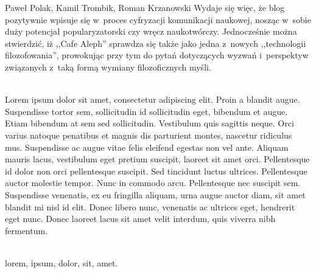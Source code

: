\begin{newrevplenv}{Paweł Polak, Kamil Trombik, Roman Krzanowski}
Wydaje się więc, że blog pozytywnie wpisuje się w~proces cyfryzacji komunikacji naukowej, nosząc w~sobie duży potencjał popularyzatorski czy wręcz naukotwórczy. Jednocześnie można stwierdzić, iż ,,Cafe Aleph'' sprawdza się także jako jedna z~nowych ,,technologii filozofowania'', prowokując przy tym do pytań dotyczących wyzwań i~perspektyw związanych z~taką formą wymiany filozoficznych myśli.




\vspace{5mm}%
\begin{flushright}
{\chaptitleeng\color{black!50}{Internet clothes of the philosophy in the information technology era -- Lorem ipsum}}
\end{flushright}

{}\\
{Lorem ipsum dolor sit amet, consectetur adipiscing elit. Proin a blandit augue. Suspendisse tortor sem, sollicitudin id sollicitudin eget, bibendum et augue. Etiam bibendum at sem sed sollicitudin. Vestibulum quis sagittis neque. Orci varius natoque penatibus et magnis dis parturient montes, nascetur ridiculus mus. Suspendisse ac augue vitae felis eleifend egestas non vel ante. Aliquam mauris lacus, vestibulum eget pretium suscipit, laoreet sit amet orci. Pellentesque id dolor non orci pellentesque suscipit. Sed tincidunt luctus ultrices. Pellentesque auctor molestie tempor. Nunc in commodo arcu. Pellentesque nec suscipit sem. Suspendisse venenatis, ex eu fringilla aliquam, urna augue auctor diam, sit amet blandit mi nisl id elit. Donec libero nunc, venenatis ac ultrices eget, hendrerit eget nunc. Donec laoreet lacus sit amet velit interdum, quis viverra nibh fermentum.}\par%
\vspace{2mm}%
{}\\%
{lorem, ipsum, dolor, sit, amet.}%


\end{newrevplenv}